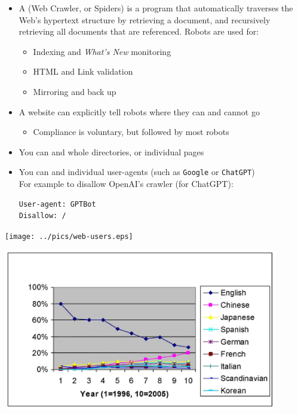 \documentclass[a4paper,landscape,headrule,footrule,xetex]{foils}
\begin{document}
\begin{itemize}
\item A  (Web Crawler, or Spiders) is a program that
  automatically traverses the Web's hypertext structure by retrieving
  a document, and recursively retrieving all documents that are
  referenced. Robots are used for:
  \begin{itemize}
  \item Indexing and \textit{What's New} monitoring
  \item HTML and Link validation  
  \item Mirroring and back up
  \end{itemize}
\item A website can explicitly tell robots where they can and cannot go
  \begin{itemize}
  \item Compliance is voluntary, but followed by most robots
  \end{itemize}
\item You can  and  whole directories, or individual pages
\item You can  and  individual user-agents
  (such as \texttt{Google} or \texttt{ChatGPT})
  \\ For example to disallow OpenAI's crawler (for ChatGPT): 
\begin{verbatim}
User-agent: GPTBot
Disallow: /
\end{verbatim}
\end{itemize}


\MyLogo{}
\begin{center}
  \texttt{[image: ../pics/web-users.eps]}
\end{center}

\begin{center}
  \includegraphics[width=0.9\textwidth]{../pics/gerrand.fig5.jpg}
\end{center}
\end{document}
